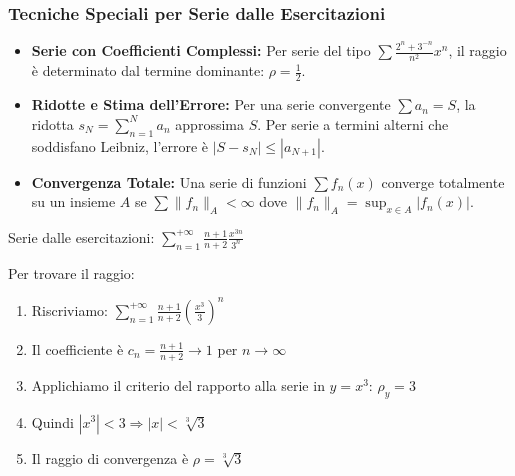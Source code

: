 \subsubsection{Tecniche Speciali per Serie dalle Esercitazioni}
\begin{itemize}
    \item \textbf{Serie con Coefficienti Complessi:} Per serie del tipo $\sum \frac{2^n + 3^{-n}}{n^2} x^n$, il raggio è determinato dal termine dominante: $\rho = \frac{1}{2}$.
    \item \textbf{Ridotte e Stima dell'Errore:} Per una serie convergente $\sum a_n = S$, la ridotta $s_N = \sum_{n=1}^N a_n$ approssima $S$. Per serie a termini alterni che soddisfano Leibniz, l'errore è $|S - s_N| \leq |a_{N+1}|$.
    \item \textbf{Convergenza Totale:} Una serie di funzioni $\sum f_n(x)$ converge totalmente su un insieme $A$ se $\sum \|f_n\|_A < \infty$ dove $\|f_n\|_A = \sup_{x \in A} |f_n(x)|$.
\end{itemize}

\begin{esempio}
Serie dalle esercitazioni: $\sum_{n=1}^{+\infty} \frac{n+1}{n+2} \frac{x^{3n}}{3^n}$

Per trovare il raggio:
\begin{enumerate}
    \item Riscriviamo: $\sum_{n=1}^{+\infty} \frac{n+1}{n+2} \left(\frac{x^3}{3}\right)^n$
    \item Il coefficiente è $c_n = \frac{n+1}{n+2} \to 1$ per $n \to \infty$
    \item Applichiamo il criterio del rapporto alla serie in $y = x^3$: $\rho_y = 3$
    \item Quindi $|x^3| < 3 \Rightarrow |x| < \sqrt[3]{3}$
    \item Il raggio di convergenza è $\rho = \sqrt[3]{3}$
\end{enumerate}
\end{esempio}
